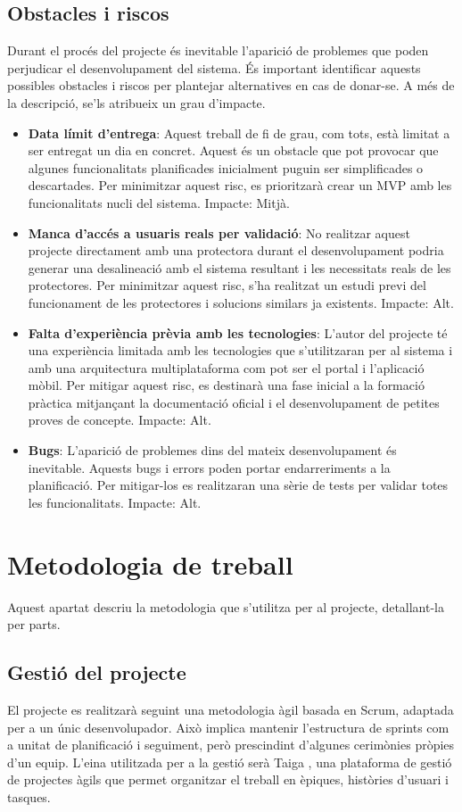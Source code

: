 \documentclass[11pt,a4paper]{report}
\begin{document}
\subsection{Obstacles i riscos}
Durant el procés del projecte és inevitable l’aparició de problemes que poden perjudicar el desenvolupament del sistema. És important identificar aquests possibles obstacles i riscos per plantejar alternatives en cas de donar-se. A més de la descripció, se'ls  atribueix un grau d’impacte.
\begin{itemize}
    \item \textbf{Data límit d’entrega}: Aquest treball de fi de grau, com tots, està limitat a ser entregat un dia en concret. Aquest és un obstacle que pot provocar que algunes funcionalitats planificades inicialment puguin ser simplificades o descartades. Per minimitzar aquest risc, es prioritzarà crear un MVP amb les funcionalitats nucli del sistema. Impacte: Mitjà.
    \item \textbf{Manca d’accés a usuaris reals per validació}: No realitzar aquest projecte directament amb una protectora durant el desenvolupament podria generar una desalineació amb el sistema resultant i les necessitats reals de les protectores. Per minimitzar aquest risc, s’ha realitzat un estudi previ del funcionament de les protectores i solucions similars ja existents. Impacte: Alt.
    \item \textbf{Falta d’experiència prèvia amb les tecnologies}: L’autor del projecte té una experiència limitada amb les tecnologies que s’utilitzaran per al sistema i amb una arquitectura multiplataforma com pot ser el portal i l’aplicació mòbil. Per mitigar aquest risc, es destinarà una fase inicial a la formació pràctica mitjançant la documentació oficial i el desenvolupament de petites proves de concepte. Impacte: Alt.
    \item \textbf{Bugs}: L’aparició de problemes dins del mateix desenvolupament és inevitable. Aquests bugs i errors poden portar endarreriments a la planificació. Per mitigar-los es realitzaran una sèrie de tests per validar totes les funcionalitats. Impacte: Alt.
\end{itemize}

\newpage
\section{Metodologia de treball}
Aquest apartat descriu la metodologia que s’utilitza per al projecte, detallant-la per parts.

\subsection{Gestió del projecte}
El projecte es realitzarà seguint una metodologia àgil basada en Scrum, adaptada per a un únic desenvolupador. Això implica mantenir l'estructura de sprints com a unitat de planificació i seguiment, però prescindint d’algunes cerimònies pròpies d'un equip. L'eina utilitzada per a la gestió serà Taiga \cite{taiga_your_nodate}, una plataforma de gestió de projectes àgils que permet organitzar el treball en èpiques, històries d'usuari i tasques.
\end{document}

